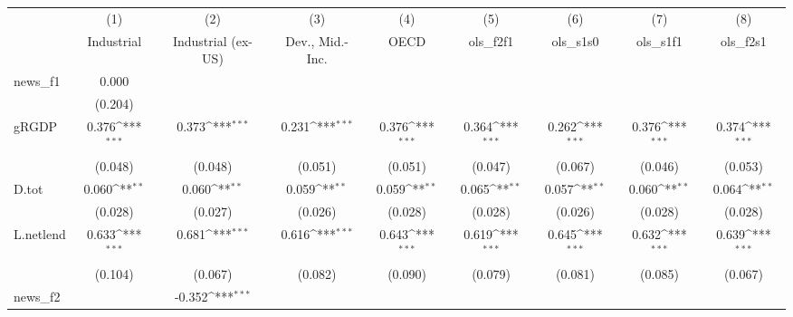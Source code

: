 {
\def\sym#1{\ifmmode^{#1}\else\(^{#1}\)\fi}
\begin{tabular}{l*{8}{c}}
\toprule
            &\multicolumn{1}{c}{(1)}&\multicolumn{1}{c}{(2)}&\multicolumn{1}{c}{(3)}&\multicolumn{1}{c}{(4)}&\multicolumn{1}{c}{(5)}&\multicolumn{1}{c}{(6)}&\multicolumn{1}{c}{(7)}&\multicolumn{1}{c}{(8)}\\
            &\multicolumn{1}{c}{Industrial}&\multicolumn{1}{c}{Industrial (ex-US)}&\multicolumn{1}{c}{Dev., Mid.-Inc.}&\multicolumn{1}{c}{OECD}&\multicolumn{1}{c}{ols\_f2f1}&\multicolumn{1}{c}{ols\_s1s0}&\multicolumn{1}{c}{ols\_s1f1}&\multicolumn{1}{c}{ols\_f2s1}\\
\midrule
news\_f1     &       0.000         &                     &                     &                     &                     &                     &                     &                     \\
            &     (0.204)         &                     &                     &                     &                     &                     &                     &                     \\
\addlinespace
gRGDP       &       0.376\sym{***}&       0.373\sym{***}&       0.231\sym{***}&       0.376\sym{***}&       0.364\sym{***}&       0.262\sym{***}&       0.376\sym{***}&       0.374\sym{***}\\
            &     (0.048)         &     (0.048)         &     (0.051)         &     (0.051)         &     (0.047)         &     (0.067)         &     (0.046)         &     (0.053)         \\
\addlinespace
D.tot       &       0.060\sym{**} &       0.060\sym{**} &       0.059\sym{**} &       0.059\sym{**} &       0.065\sym{**} &       0.057\sym{**} &       0.060\sym{**} &       0.064\sym{**} \\
            &     (0.028)         &     (0.027)         &     (0.026)         &     (0.028)         &     (0.028)         &     (0.026)         &     (0.028)         &     (0.028)         \\
\addlinespace
L.netlend   &       0.633\sym{***}&       0.681\sym{***}&       0.616\sym{***}&       0.643\sym{***}&       0.619\sym{***}&       0.645\sym{***}&       0.632\sym{***}&       0.639\sym{***}\\
            &     (0.104)         &     (0.067)         &     (0.082)         &     (0.090)         &     (0.079)         &     (0.081)         &     (0.085)         &     (0.067)         \\
\addlinespace
news\_f2     &                     &      -0.352\sym{***}&                     &                     &                     &                     &                     &                     \\

\end{tabular}}
